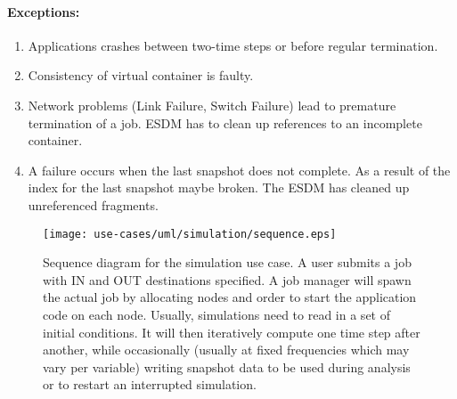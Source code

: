 \paragraph{Exceptions:}
\begin{enumerate}
	\item Applications crashes between two-time steps or before regular termination.
	\item Consistency of virtual container is faulty.
	\item Network problems (Link Failure, Switch Failure) lead to premature termination of a job. ESDM has to clean up references to an incomplete container.
	\item A failure occurs when the last snapshot does not complete. As a result of the index for the last snapshot maybe broken. The ESDM has cleaned up unreferenced fragments.
\end{enumerate}


\begin{figure}
	\centering
	\texttt{[image: use-cases/uml/simulation/sequence.eps]}
	\caption{Sequence diagram for the simulation use case. A user submits a job with IN and OUT destinations specified. A job manager will spawn the actual job by allocating nodes and order to start the application code on each node. Usually, simulations need to read in a set of initial conditions. It will then iteratively compute one time step after another, while occasionally (usually at fixed frequencies which may vary per variable) writing snapshot data to be used during analysis or to restart an interrupted simulation.}
	\label{fig:sequence simulation}
\end{figure}









